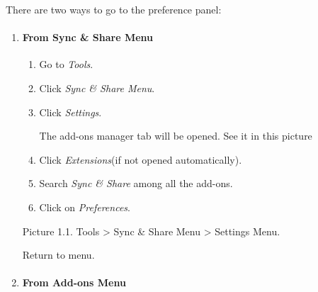 \documentclass{article}
\begin{document}
						\begin{description}
							\item[ \textbf{\subsubsection*{
								 1.1.How to go to preferences panel?}}\\
							
								]
									\par There are two ways to go to the preference panel:
									
										\begin{enumerate}
											\item \paragraph*{From Sync \& Share Menu}
												
												\begin{enumerate}
													\item Go to \emph{Tools}.
													\item Click \emph{Sync \& Share Menu}.
													\item Click \emph{Settings}.
													\par The add-ons manager tab will be opened. See it in 
													this picture
													 
													
													
													\item Click \emph{Extensions}(if not opened automatically).
													\item Search \emph{Sync \& Share} among all the add-ons.
													\item Click on \emph{Preferences}.
													
													
												\end{enumerate}
												
													
													
													
														Picture 1.1. Tools > Sync \& Share Menu > Settings Menu.
													
												
												
											
											 
												Return to menu.
											\item \paragraph*{From Add-ons Menu}
												

\end{enumerate}
\end{description}
\end{document}
